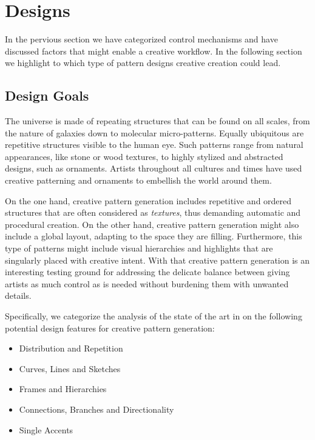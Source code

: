 
\section{Designs}

In the pervious section we have categorized control mechanisms and have discussed factors that might enable a creative workflow. In the following section we highlight to which type of pattern designs creative creation could lead.

\subsection{Design Goals}
\label{subsec:design_goals}

The universe is made of repeating structures that can be found on all scales, from the nature of galaxies down to molecular micro-patterns. Equally ubiquitous are repetitive structures visible to the human eye. Such patterns range from natural appearances, like stone or wood textures, to highly stylized and abstracted designs, such as ornaments. Artists throughout all cultures and times have used creative patterning and ornaments to embellish the world around them. 

On the one hand, creative pattern generation includes repetitive and ordered structures that are often considered as \textit{textures}, thus demanding automatic and procedural creation. On the other hand, creative pattern generation might also include a global layout, adapting to the space they are filling. Furthermore, this type of patterns might include visual hierarchies and highlights that are singularly placed with creative intent. With that creative pattern generation is an interesting testing ground for addressing the delicate balance between giving artists as much control as is needed without burdening them with unwanted details.

Specifically, we categorize the analysis of the state of the art in  on the following potential design features for creative pattern generation:


\begin{itemize}
    \item Distribution and Repetition
    \item Curves, Lines and Sketches
    \item Frames and Hierarchies
    \item Connections, Branches and Directionality
    \item Single Accents
\end{itemize}

